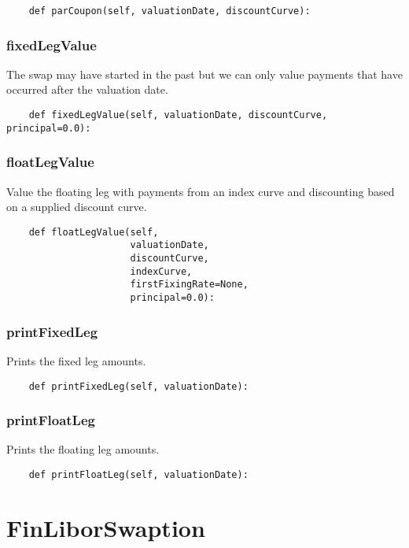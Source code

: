 \documentclass[twoside,11pt]{book}
\begin{document}
\begin{lstlisting}
    def parCoupon(self, valuationDate, discountCurve):
\end{lstlisting}

\subsubsection*{{\bf fixedLegValue}}
The swap may have started in the past but we can only value payments that have occurred after the valuation date.  

\begin{lstlisting}
    def fixedLegValue(self, valuationDate, discountCurve, principal=0.0):
\end{lstlisting}

\subsubsection*{{\bf floatLegValue}}
Value the floating leg with payments from an index curve and discounting based on a supplied discount curve.  

\begin{lstlisting}
    def floatLegValue(self,
                      valuationDate,
                      discountCurve,
                      indexCurve,
                      firstFixingRate=None,
                      principal=0.0):
\end{lstlisting}

\subsubsection*{{\bf printFixedLeg}}
Prints the fixed leg amounts.  

\begin{lstlisting}
    def printFixedLeg(self, valuationDate):
\end{lstlisting}

\subsubsection*{{\bf printFloatLeg}}
Prints the floating leg amounts.  

\begin{lstlisting}
    def printFloatLeg(self, valuationDate):
\end{lstlisting}

\newpage
\section{FinLiborSwaption}
\end{document}
